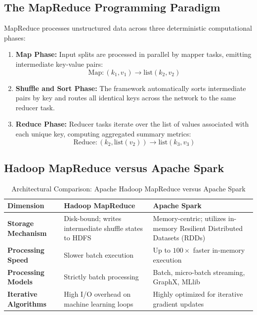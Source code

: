 \subsection{The MapReduce Programming Paradigm}
MapReduce processes unstructured data across three deterministic computational phases:
\begin{enumerate}
    \item \textbf{Map Phase:} Input splits are processed in parallel by mapper tasks, emitting intermediate key-value pairs:
    \begin{equation}
    \text{Map}: (k_1, v_1) \to \text{list}(k_2, v_2)
    \end{equation}
    \item \textbf{Shuffle and Sort Phase:} The framework automatically sorts intermediate pairs by key and routes all identical keys across the network to the same reducer task.
    \item \textbf{Reduce Phase:} Reducer tasks iterate over the list of values associated with each unique key, computing aggregated summary metrics:
    \begin{equation}
    \text{Reduce}: (k_2, \text{list}(v_2)) \to \text{list}(k_3, v_3)
    \end{equation}
\end{enumerate}

\subsection{Hadoop MapReduce versus Apache Spark}
\begin{table}[htbp]
\centering
\small
\caption{Architectural Comparison: Apache Hadoop MapReduce versus Apache Spark}
\label{tab:hadoop_vs_spark}
\begin{tabularx}{\textwidth}{p{3.5cm}XX}
\toprule
\textbf{Dimension} & \textbf{Hadoop MapReduce} & \textbf{Apache Spark} \\
\midrule
\textbf{Storage Mechanism} & Disk-bound; writes intermediate shuffle states to HDFS & Memory-centric; utilizes in-memory Resilient Distributed Datasets (RDDs) \\
\textbf{Processing Speed} & Slower batch execution & Up to $100\times$ faster in-memory execution \\
\textbf{Processing Models} & Strictly batch processing & Batch, micro-batch streaming, GraphX, MLlib \\
\textbf{Iterative Algorithms} & High I/O overhead on machine learning loops & Highly optimized for iterative gradient updates \\
\bottomrule
\end{tabularx}
\end{table}


